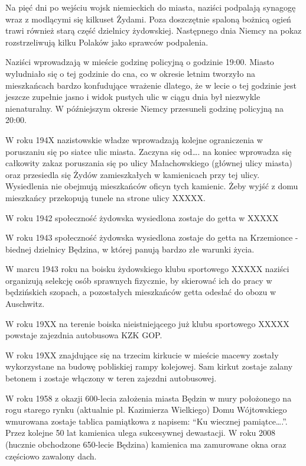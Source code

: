 \documentclass[11pt,a4paper,oneside]{article}
\begin{document}
Na pięć dni po wejściu wojsk niemieckich do miasta, naziści podpalają synagogę wraz z modlącymi się kilkuset Żydami. Poza doszczętnie spaloną bożnicą ogień trawi również starą część dzielnicy żydowskiej. Następnego dnia Niemcy na pokaz rozstrzeliwują kilku Polaków jako sprawców podpalenia.

Naziści wprowadzają w mieście godzinę policyjną o godzinie 19:00. Miasto wyludniało się o tej godzinie do cna, co w okresie letnim tworzyło na mieszkańcach bardzo konfudujące wrażenie dlatego, że w lecie o tej godzinie jest jeszcze zupełnie jasno i widok pustych ulic w ciągu dnia był niezwykle nienaturalny. W późniejszym okresie Niemcy przesuneli godzinę policyjną na 20:00.

W roku 194X nazistowskie władze wprowadzają kolejne ograniczenia w poruszaniu się po siatce ulic miasta. Zaczyna się od…. na koniec wprowadza się całkowity zakaz poruszania się po ulicy Małachowskiego (głównej ulicy miasta) oraz przesiedla się Żydów zamieszkałych w kamienicach przy tej ulicy. Wysiedlenia nie obejmują mieszkańców oficyn tych kamienic. Żeby wyjść z domu mieszkańcy przekopują tunele na strone ulicy XXXXX.

W roku 1942 społeczność żydowska wysiedlona zostaje do getta w XXXXX

W roku 1943 społeczność żydowska wysiedlona zostaje do getta na Krzemionce - biednej dzielnicy Będzina, w której panują bardzo złe warunki życia.

W marcu 1943 roku na boisku żydowskiego klubu sportowego XXXXX naziści organizują selekcję osób sprawnych fizycznie, by skierować ich do pracy w będzińskich szopach, a pozostałych mieszkańców getta odesłać do obozu w Auschwitz.

W roku 19XX na terenie boiska nieistniejącego już klubu sportowego XXXXX powstaje zajezdnia autobusowa KZK GOP.

W roku 19XX znajdujące się na trzecim kirkucie w mieście macewy zostały wykorzystane na budowę pobliskiej rampy kolejowej. Sam kirkut zostaje zalany betonem i zostaje włączony w teren zajezdni autobusowej.

W roku 1958 z okazji 600-lecia założenia miasta Będzin w mury położonego na rogu starego rynku (aktualnie pl. Kazimierza Wielkiego) Domu Wójtowskiego wmurowana zostaje tablica pamiątkowa z napisem: “Ku wiecznej pamiątce….”. Przez kolejne 50 lat kamienica ulega sukcesywnej dewastacji. W roku 2008 (hucznie obchodzone 650-lecie Będzina) kamienica ma zamurowane okna oraz częściowo zawalony dach.
\end{document}
